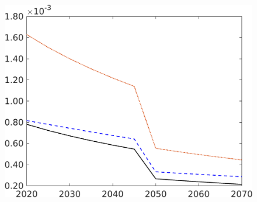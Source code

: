 \begin{figure}[h!!]
\begin{minipage}[]{0.32\textwidth}
\end{minipage}
	\begin{minipage}[]{0.32\textwidth}
		\includegraphics[width=1\textwidth]{../../codding_model/own_basedOnFried/optimalPol_190722_tidiedUp/figures/all_10Aout22/CountMod1_target_Lf_regime3_spillover0_sep1_extern0_PV1_etaa0.79_lgd0.png}
	\end{minipage}
\end{figure}

